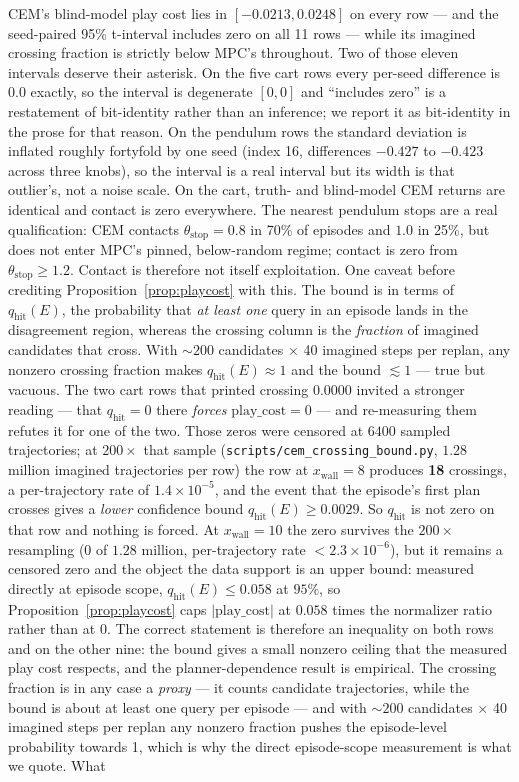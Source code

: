 \documentclass[11pt]{article}
\theoremstyle{definition}
\theoremstyle{remark}
\begin{document}
CEM's blind-model play cost lies in $[-0.0213,0.0248]$ on every row --- and the seed-paired 95\% t-interval includes zero on all 11 rows --- while its imagined crossing fraction is strictly below MPC's throughout. Two of those eleven intervals deserve their asterisk. On the five cart rows every per-seed difference is $0.0$ exactly, so the interval is degenerate $[0,0]$ and ``includes zero'' is a restatement of bit-identity rather than an inference; we report it as bit-identity in the prose for that reason. On the pendulum rows the standard deviation is inflated roughly fortyfold by one seed (index 16, differences $-0.427$ to $-0.423$ across three knobs), so the interval is a real interval but its width is that outlier's, not a noise scale. On the cart, truth- and blind-model CEM returns are identical and contact is zero everywhere. The nearest pendulum stops are a real qualification: CEM contacts $\theta_\mathrm{stop}=0.8$ in 70\% of episodes and $1.0$ in 25\%, but does not enter MPC's pinned, below-random regime; contact is zero from $\theta_\mathrm{stop}\geq1.2$. Contact is therefore not itself exploitation. One caveat before crediting Proposition~\ref{prop:playcost} with this. The bound is in terms of $q_{\mathrm{hit}}(E)$, the probability that \emph{at least one} query in an episode lands in the disagreement region, whereas the crossing column is the \emph{fraction} of imagined candidates that cross. With ${\sim}200$ candidates $\times$ 40 imagined steps per replan, any nonzero crossing fraction makes $q_{\mathrm{hit}}(E) \approx 1$ and the bound $\lesssim 1$ --- true but vacuous. The two cart rows that printed crossing $0.0000$ invited a stronger reading --- that $q_{\mathrm{hit}} = 0$ there \emph{forces} $\mathrm{play\_cost} = 0$ --- and re-measuring them refutes it for one of the two. Those zeros were censored at $6400$ sampled trajectories; at $200\times$ that sample (\texttt{scripts/\allowbreak cem\_\allowbreak crossing\_\allowbreak bound.py}, $1.28$ million imagined trajectories per row) the row at $x_\mathrm{wall} = 8$ produces \textbf{18} crossings, a per-trajectory rate of $1.4\times10^{-5}$, and the event that the episode's first plan crosses gives a \emph{lower} confidence bound $q_{\mathrm{hit}}(E) \geq 0.0029$. So $q_{\mathrm{hit}}$ is not zero on that row and nothing is forced. At $x_\mathrm{wall} = 10$ the zero survives the $200\times$ resampling ($0$ of $1.28$ million, per-trajectory rate $<2.3\times10^{-6}$), but it remains a censored zero and the object the data support is an upper bound: measured directly at episode scope, $q_{\mathrm{hit}}(E) \leq 0.058$ at $95\%$, so Proposition~\ref{prop:playcost} caps $|\mathrm{play\_cost}|$ at $0.058$ times the normalizer ratio rather than at $0$. The correct statement is therefore an inequality on both rows and on the other nine: the bound gives a small nonzero ceiling that the measured play cost respects, and the planner-dependence result is empirical. The crossing fraction is in any case a \emph{proxy} --- it counts candidate trajectories, while the bound is about at least one query per episode --- and with ${\sim}200$ candidates $\times$ 40 imagined steps per replan any nonzero fraction pushes the episode-level probability towards 1, which is why the direct episode-scope measurement is what we quote. What 
\end{document}
